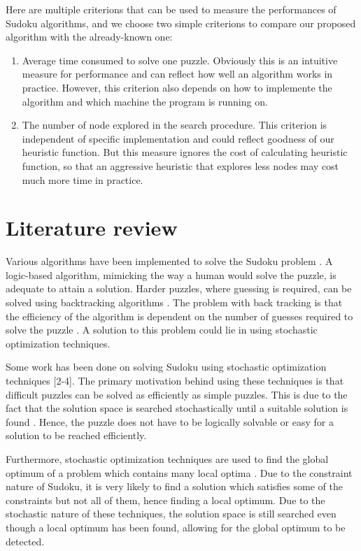 \documentclass[12pt]{article}
\begin{document}
\begin{spacing}{1.1}
Here are multiple criterions that can be used to measure the performances of Sudoku algorithms, and we choose two simple criterions to compare our proposed algorithm with the already-known one:
\begin{enumerate}
	\item Average time consumed to solve one puzzle. Obviously this is an intuitive measure for performance and can reflect how well an algorithm works in practice. However, this criterion also depends on how to implemente the algorithm and which machine the program is running on.
	\item The number of node explored in the search procedure. This criterion is independent of specific implementation and could reflect goodness of our heuristic function. But this measure ignores the cost of calculating heuristic function, so that an aggressive heuristic that explores less nodes may cost much more time in practice.
\end{enumerate}

\section{Literature review}

Various algorithms have been implemented to solve the Sudoku problem \cite{sspr}. A logic-based algorithm, mimicking the way a human would solve the puzzle, is adequate to attain a solution. Harder puzzles, where guessing is required, can be solved using backtracking algorithms \cite{sspr}. The problem with back tracking is that the efficiency of the algorithm is dependent on the number of guesses required to solve the puzzle \cite{tj}. A solution to this problem could lie in using stochastic optimization techniques.

Some work has been done on solving Sudoku using stochastic optimization techniques [2-4]. The primary motivation behind using these techniques is that difficult puzzles can be solved as efficiently as simple puzzles. This is due to the fact that the solution space is searched stochastically until a suitable solution is found \cite{tj}. Hence, the puzzle does not have to be logically solvable or easy for a solution to be reached efficiently.

Furthermore, stochastic optimization techniques are used to find the global optimum of a problem which contains many local optima \cite{aj}. Due to the constraint nature of Sudoku, it is very likely to find a solution which satisfies some of the constraints but not all of them, hence finding a local optimum. Due to the stochastic nature of these techniques, the solution space is still searched even though a local optimum has been found, allowing for the global optimum to be detected.


\end{spacing}
\end{document}
